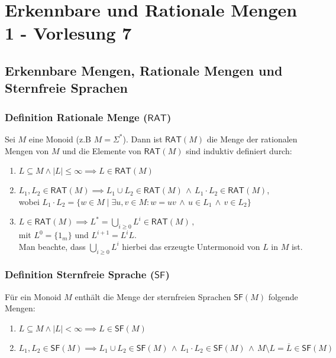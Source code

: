 \documentclass[12pt, german]{article}
\newcommand{\sigstern}{\Sigma^\ast}
\newcommand{\rat}{\mathsf{RAT}}
\newcommand{\starfree}{\mathsf{SF}}
\begin{document}
	\section{Erkennbare und Rationale Mengen 1 - Vorlesung 7}
	\subsection{Erkennbare Mengen, Rationale Mengen und Sternfreie Sprachen}
	\subsubsection{Definition Rationale Menge ($\rat$)}
	Sei $M$ eine Monoid (z.B $M = \sigstern$).
	Dann ist $\rat(M)$ die Menge der rationalen Mengen von $M$ und die Elemente von $\rat(M)$ sind induktiv definiert durch:
	\begin{enumerate}[label=\arabic*)]
		\item $L \subseteq M \wedge |L| \leq \infty \implies L \in \rat(M)$
		\item $L_1, L_2 \in \rat(M) \implies L_1 \cup L_2 \in \rat(M) \, \wedge \, L_1 \cdot L_2 \in \rat(M)$, \\ 
		wobei $ L_1 \cdot L_2 = \{w \in M \mid \exists u,v \in M : w = uv \, \wedge \, u \in L_1 \,\wedge\, v \in L_2\}$
		\item $L \in \rat(M) \implies L^\ast = \bigcup_{i \geq 0} L^i \in \rat(M)\,,$\\
		mit $L^0=\{1_m\}$ und $L^{i+1} = L^iL$.\\ \newline
		Man beachte, dass $\bigcup_{i \geq 0} L^i $ hierbei das erzeugte Untermonoid von $L$ in $M$ ist.
	\end{enumerate}
	
	
	\subsubsection{Definition Sternfreie Sprache ($\starfree$)}
	Für ein Monoid $M$ enthält die Menge der sternfreien Sprachen $\starfree(M)$ folgende Mengen:
	\begin{enumerate}[label=\arabic*)]
		\item $L \subseteq M \wedge |L| < \infty \implies L \in \starfree(M)$
		\item $L_1, L_2 \in \starfree(M) \implies L_1 \cup L_2 \in \starfree(M) \, \wedge \, L_1 \cdot L_2 \in \starfree(M) \, \wedge \, M \setminus L = \overline{L} \in \starfree(M)$\\ 
	\end{enumerate}
	
\end{document}
